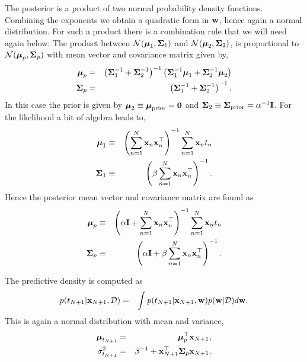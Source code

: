 \documentclass[A4,12pt]{article}    %
\def\xb{{\bf x}}
\def\wb{{\bf w}}
\def\mub{\text{\boldmath $\mu$}}
\def\Sigb{\text{\boldmath $\Sigma$}}
\def\xb{{\bf x}}
\begin{document}
The posterior is a product of two normal probability density functions. Combining the exponents we obtain a quadratic form in $\wb$, hence again a normal distribution.
For such a product there is a combination rule that we will need again below: The product between $\mathcal{N}(\mub_1,\Sigb_1)$ and $\mathcal{N}(\mub_2,\Sigb_2)$, is
proportional to $\mathcal{N}(\mub_p,\Sigb_p)$ with mean vector and covariance matrix given by,
\begin{eqnarray}
 \mub_p &=& \left(\Sigb_1^{-1}+\Sigb_2^{-1}\right)^{-1}\left(\Sigb_1^{-1}\mub_1 + \Sigb_2^{-1}\mub_2 \right) \nonumber \\
 \Sigb_p &=& \left(\Sigb_1^{-1}+\Sigb_2^{-1}\right)^{-1} \label{product rule}.
\end{eqnarray}
In this case the prior is given by $\mub_2 \equiv \mub_{\rm prior} ={\bf 0}$ and $\Sigb_2 \equiv \Sigb_{\rm prior} =\alpha^{-1}{\bf I}$.
For the likelihood a bit of algebra leads to,
\begin{eqnarray}
 \mub_1 &\equiv&  \left(\sum_{n=1}^{N}\xb_n \xb_n^{\top}\right)^{-1}\sum_{n=1}^{N}\xb_n t_n \nonumber \\
 \Sigb_1 &\equiv& \left(\beta \sum_{n=1}^{N}\xb_n \xb_n^{\top}\right)^{-1}.
\end{eqnarray}
Hence the posterior mean vector and covariance matrix are found as
\begin{eqnarray}
 \mub_p &\equiv&  \left(\alpha {\bf I} + \sum_{n=1}^{N}\xb_n \xb_n^{\top}\right)^{-1}\sum_{n=1}^{N}\xb_n t_n \nonumber \\
 \Sigb_p &\equiv& \left(\alpha {\bf I} + \beta \sum_{n=1}^{N}\xb_n \xb_n^{\top}\right)^{-1}.
\end{eqnarray}

The predictive density is computed as
\begin{eqnarray}
  p(t_{N+1}|\xb_{N+1},\mathcal{D}) &=& \int p(t_{N+1}|\xb_{N+1},\wb) p(\wb|\mathcal{D}) d\wb.
\end{eqnarray}
This is again a normal distribution with mean and variance,
\begin{eqnarray}
 \mub_{t_{N+1}} &=& \mub_p^{\top}\xb_{N+1}, \nonumber \\
 \sigma^2_{t_{N+1}} &= & \beta^{-1} + \xb^{\top}_{N+1} \Sigb_p \xb_{N+1}. \label{predictive mean}
\end{eqnarray}
\end{document}
